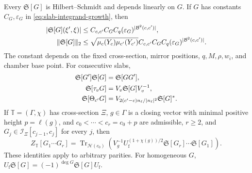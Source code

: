 \documentclass[11pt,letterpaper,reqno]{amsart}
\begin{document}
\begin{proposition}\label{thm:slab-operators}
Every $\mathfrak S[G]$ is Hilbert--Schmidt and depends linearly on $G$.
If $G$ has constants $C_G,\varepsilon_G$ in
\eqref{eq:slab-integrand-growth}, then
\begin{align}\label{eq:slab-kernel-bound}
 |\mathfrak S[G](\xi',\xi)|
    &\le C_{c,c'}C_GC_q(\varepsilon_G)^{|\mathcal B^2(c,c')|},\notag\\
 \|\mathfrak S[G]\|_2
    &\le\sqrt{\mu_c(Y_c)\mu_{c'}(Y_{c'})}
                C_{c,c'}C_GC_q(\varepsilon_G)^{|\mathcal B^2(c,c')|}.
\end{align}
The constant depends on the fixed cross-section, mirror positions,
$q,M,\rho,w_i$, and chamber base point. For consecutive slabs,
\begin{align}\label{eq:slab-operator-rules}
 \mathfrak S[G']\mathfrak S[G]&=\mathfrak S[GG'],\notag\\
 \mathfrak S[\tau_vG]&=V_v\mathfrak S[G]V_v^{-1},\\
 \mathfrak S[\Theta_{c'}G]&=V_{2(c'-c)n_\ell/|n_\ell|^2}
                                         \mathfrak S[G]^*.\notag
\end{align}
If $\mathbb T=(\Gamma,\chi)$ has cross-section $\Xi$, $g\in\Gamma$
is a closing vector with minimal positive height $p=\ell(g)$, and
$c_0<\cdots<c_r=c_0+p$ are admissible, $r\ge2$, and
$G_j\in\mathcal I_\Xi[c_{j-1},c_j]$ for every $j$, then
\begin{equation}\label{eq:slab-trace}
 Z_{\mathbb T}[G_1\cdots G_r]
    =\operatorname{Tr}_{\mathcal H(c_0)}
       \left(V_g^{-1}U_{\mathrm f}^{(1+\chi(g))/2}
               \mathfrak S[G_r]\cdots\mathfrak S[G_1]\right).
\end{equation}
These identities apply to arbitrary parities. For homogeneous $G$,
$U_{\mathrm f}\mathfrak S[G]=(-1)^{\deg G}\mathfrak S[G]U_{\mathrm f}$.
\end{proposition}
\end{document}
